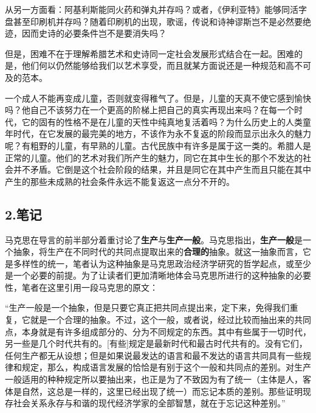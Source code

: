 \documentclass[a4paper,twoside,12pt,AutoFakeBold]{ctexart}
\begin{document}
从另一方面看：阿基利斯能同火药和弹丸并存吗？或者，《伊利亚特》能够同活字盘甚至印刷机并存吗？随着印刷机的出现，歌谣，传说和诗神谬斯岂不是必然要绝迹，因而史诗的必要条件岂不是要消失吗？

但是，困难不在于理解希腊艺术和史诗同一定社会发展形式结合在一起。困难的是，他们何以仍然能够给我们以艺术享受，而且就某方面说还是一种规范和高不可及的范本。

一个成人不能再变成儿童，否则就变得稚气了。但是，儿童的天真不使它感到愉快吗？他自己不该努力在一个更高的阶梯上把自己的真实再现出来吗？在每一个时代，它的固有的性格不是在儿童的天性中纯真地复活着吗？为什么历史上的人类童年时代，在它发展的最完美的地方，不该作为永不复返的阶段而显示出永久的魅力呢？有粗野的儿童，有早熟的儿童。古代民族中有许多是属于这一类的。希腊人是正常的儿童。他们的艺术对我们所产生的魅力，同它在其中生长的那个不发达的社会并不矛盾。它倒是这个社会阶段的结果，并且是同它在其中产生而且只能在其中产生的那些未成熟的社会条件永远不能复返这一点分不开的。
\newpage
\subsection{2.笔记}
马克思在导言的前半部分着重讨论了\textbf{生产}与\textbf{生产一般}。马克思指出，\textbf{生产一般}是一个抽象，将生产在不同时代的共同点提取出来的\textbf{合理的}抽象。就这一抽象而言，它是多样性的统一，笔者认为这种抽象是马克思政治经济学研究的哲学起点，或至少是一个必要的前提。为了让读者们更加清晰地体会马克思所进行的这种抽象的必要性，笔者在这里引用一段马克思的原文：

\begin{fangsong}
    “生产一般是一个抽象，但是只要它真正把共同点提出来，定下来，免得我们重复，它就是一个合理的抽象。不过，这个一般，或者说，经过比较而抽出来的共同点，本身就是有许多组成部分的、分为不同规定的东西。其中有些属于一切时代，另一些是几个时代共有的。[有些]规定是最新时代和最古时代共有的。没有它们，任何生产都无从设想；但是如果说最发达的语言和最不发达的语言共同具有一些规律和规定，那么，构成语言发展的恰恰是有别于这个一般和共同点的差别。对生产一般适用的种种规定所以要抽出来，也正是为了不致因为有了统一（主体是人，客体是自然，这总是一样的，这里已经出现了统一）而忘记本质的差别。那些证明现存社会关系永存与和谐的现代经济学家的全部智慧，就在于忘记这种差别。”
\end{fangsong}
\end{document}
